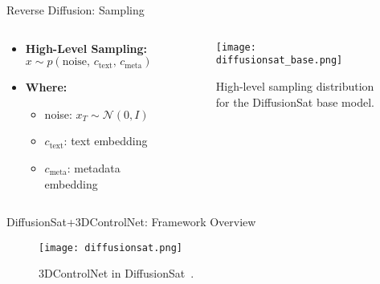 \begin{refsection}
  \begin{frame}{Reverse Diffusion: Sampling}
    \begin{columns}[t]
      \begin{column}{0.4\textwidth}
        \small
        \begin{itemize}
          \item \textbf{High-Level Sampling:} \(x \sim p(\text{noise},\,c_{\text{text}},\,c_{\text{meta}})\)
          \item \textbf{Where:}
          \begin{itemize}
            \item noise: \(x_T\!\sim\!\mathcal{N}(0,I)\)
            \item \(c_{\text{text}}\): text embedding
            \item \(c_{\text{meta}}\): metadata embedding
          \end{itemize}
        \end{itemize}
      \end{column}
      \begin{column}{0.6\textwidth}
        \begin{figure}
          \centering
          \texttt{[image: diffusionsat\_base.png]}
          \caption{\scriptsize High-level sampling distribution for the DiffusionSat base model.}
        \end{figure}
      \end{column}
    \end{columns}
    \bottomleftrefs
  \end{frame}
\end{refsection}

  

  \begin{refsection}
    \begin{frame}{DiffusionSat+3DControlNet: Framework Overview}
      \begin{figure}
        \centering
        \texttt{[image: diffusionsat.png]}
        \caption[]{\scriptsize 3DControlNet in DiffusionSat~\parencite{diffusionset2024}.}
      \end{figure}
      \bottomleftrefs
    \end{frame}
    \end{refsection}

